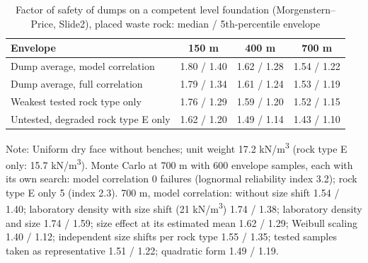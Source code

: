 \documentclass[Journal,letterpaper,InsideFigs,NoLists,NoLineNumbers]{ascelike-new}
\begin{document}
\begin{table}[htbp]
\caption{Factor of safety of dumps on a competent level foundation (Morgenstern--Price, Slide2), placed waste rock: median / 5th-percentile envelope}
\centering\small
\renewcommand{\arraystretch}{1.2}
\setlength{\tabcolsep}{3.5pt}
\begin{tabular}{lccc}
\hline
Envelope & 150 m & 400 m & 700 m \\
\hline
Dump average, model correlation & 1.80 / 1.40 & 1.62 / 1.28 & 1.54 / 1.22 \\
Dump average, full correlation & 1.79 / 1.34 & 1.61 / 1.24 & 1.53 / 1.19 \\
Weakest tested rock type only & 1.76 / 1.29 & 1.59 / 1.20 & 1.52 / 1.15 \\
Untested, degraded rock type E only & 1.62 / 1.20 & 1.49 / 1.14 & 1.43 / 1.10 \\
\hline
\end{tabular}
\par\vspace{4pt}\parbox{\linewidth}{\footnotesize Note: Uniform dry face without benches; unit weight 17.2 kN/m\textsuperscript{3} (rock type E only: 15.7 kN/m\textsuperscript{3}). Monte Carlo at 700 m with 600 envelope samples, each with its own search: model correlation 0 failures (lognormal reliability index 3.2); rock type E only 5 (index 2.3). 700 m, model correlation: without size shift 1.54 / 1.40; laboratory density with size shift (21 kN/m\textsuperscript{3}) 1.74 / 1.38; laboratory density and size 1.74 / 1.59; size effect at its estimated mean 1.62 / 1.29; Weibull scaling 1.40 / 1.12; independent size shifts per rock type 1.55 / 1.35; tested samples taken as representative 1.51 / 1.22; quadratic form 1.49 / 1.19.}
\end{table}
\end{document}
